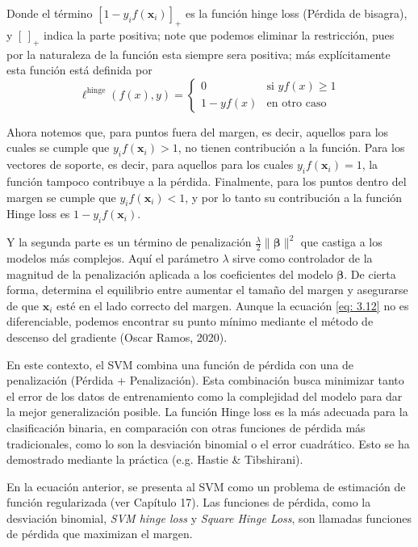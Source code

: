 \documentclass[letterpaper,12pt,oneside]{book}
\begin{document}
{{{{{Donde el término \(\left[1 - y_i f(\mathbf{x}_i)\right]_+\) es la función hinge loss (Pérdida de bisagra), y \([\,]_+\) indica la parte positiva; note que podemos eliminar la restricción, pues por la naturaleza de la función esta siempre sera positiva; más explícitamente esta función está definida por 
    \begin{equation}
        \ell^{\text{hinge}}(f(x), y) = 
        \begin{cases}
        0 & \text{si } yf(x) \geq 1 \\
        1 - yf(x) & \text{en otro caso}
        \end{cases}
    \end{equation}


Ahora notemos que, para puntos fuera del margen, es decir, aquellos para los cuales se cumple que $y_i f(\mathbf{x}_i) > 1$, no tienen contribución a la función. Para los vectores de soporte, es decir, para aquellos para los cuales $y_i f(\mathbf{x}_i) = 1$, la función tampoco contribuye a la pérdida. Finalmente, para los puntos dentro del margen se cumple que $y_i f(\mathbf{x}_i) < 1$, y por lo tanto su contribución a la función Hinge loss es $1 - y_i f(\mathbf{x}_i)$.

Y la segunda parte es un término de penalización \(\frac{\lambda}{2} \|\boldsymbol{\beta}\|^2\) que castiga a los modelos más complejos. Aquí el parámetro \(\lambda\) sirve como controlador de la magnitud de la penalización aplicada a los coeficientes del modelo \(\boldsymbol{\beta}\). De cierta forma, determina el equilibrio entre aumentar el tamaño del margen y asegurarse de que $\mathbf{x}_i$ esté en el lado correcto del margen. Aunque la ecuación \eqref{eq: 3.12} no es diferenciable, podemos encontrar su punto mínimo mediante el método de descenso del gradiente (Oscar Ramos, 2020).

En este contexto, el SVM combina una función de pérdida con una de penalización (Pérdida + Penalización). Esta combinación busca minimizar tanto el error de los datos de entrenamiento como la complejidad del modelo para dar la mejor generalización posible. La función Hinge loss es la más adecuada para la clasificación binaria, en comparación con otras funciones de pérdida más tradicionales, como lo son la desviación binomial o el error cuadrático. Esto se ha demostrado mediante la práctica (e.g. Hastie \& Tibshirani).

En la ecuación anterior, se presenta al SVM como un problema de estimación de función regularizada (ver Capítulo 17). Las funciones de pérdida, como la desviación binomial, \textit{SVM hinge loss} y \textit{Square Hinge Loss}, son llamadas funciones de pérdida que maximizan el margen.

}}}}}
\end{document}
